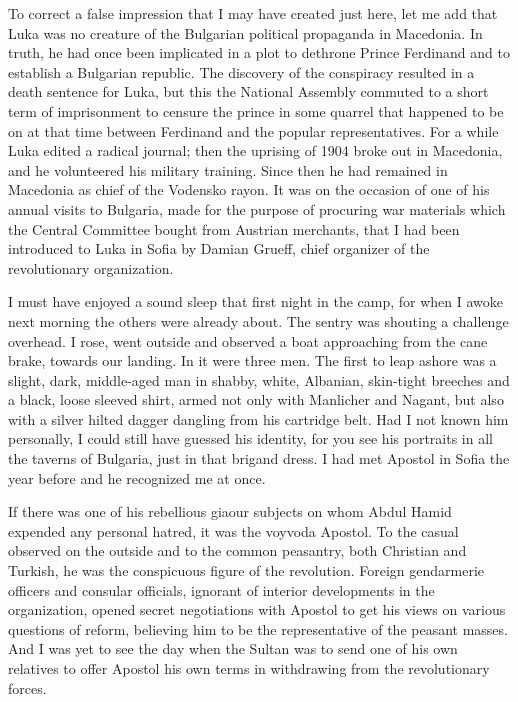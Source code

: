 \documentclass[a5paper,12pt]{book}
\begin{document}
To correct a false impression that I may have created just here, let me add that Luka was no creature of the Bulgarian political propaganda in Macedonia. In truth, he had once been implicated in a plot to dethrone Prince Ferdinand and to establish a Bulgarian republic. The discovery of the conspiracy resulted in a death sentence for Luka, but this the National Assembly commuted to a short term of imprisonment to censure the prince in some quarrel that happened to be on at that time between Ferdinand and the popular representatives. For a while Luka edited a radical journal; then the uprising of 1904 broke out in Macedonia, and he volunteered his military training. Since then he had remained in Macedonia as chief of the Vodensko rayon. It was on the occasion of one of his annual visits to Bulgaria, made for the purpose of procuring war materials which the Central Committee bought from Austrian merchants, that I had been introduced to Luka in Sofia by Damian Grueff, chief organizer of the revolutionary organization. 

I must have enjoyed a sound sleep that first night in the camp, for when I awoke next morning the others were already about. The sentry was shouting a challenge overhead. I rose, went outside and observed a boat approaching from the cane brake, towards our landing. In it were three men. The first to leap ashore was a slight, dark, middle-aged man in shabby, white, Albanian, skin-tight breeches and a black, loose sleeved shirt, armed not only with Manlicher and Nagant, but also with a silver hilted dagger dangling from his cartridge belt. Had I not known him personally, I could still have guessed his identity, for you see his portraits in all the taverns of Bulgaria, just in that brigand dress. I had met Apostol in Sofia the year before and he recognized me at once. 

If there was one of his rebellious giaour subjects on whom Abdul Hamid expended any personal hatred, it was the voyvoda Apostol. To the casual observed on the outside and to the common peasantry, both Christian and Turkish, he was the conspicuous figure of the revolution. Foreign gendarmerie officers and consular officials, ignorant of interior developments in the organization, opened secret negotiations with Apostol to get his views on various questions of reform, believing him to be the representative of the peasant masses. And I was yet to see the day when the Sultan was to send one of his own relatives to offer Apostol his own terms in withdrawing from the revolutionary forces. 
\end{document}
